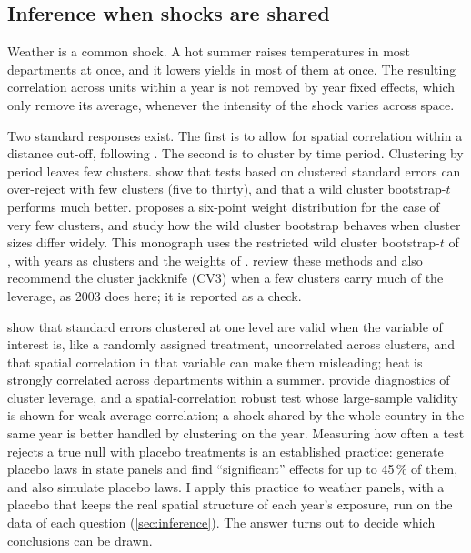 \subsection{Inference when shocks are shared}

Weather is a common shock. A hot summer raises temperatures in most departments at once, and it lowers yields in most of them at once. The resulting correlation across units within a year is not removed by year fixed effects, which only remove its average, whenever the intensity of the shock varies across space.

Two standard responses exist. The first is to allow for spatial correlation within a distance cut-off, following \textcite{conley1999}. The second is to cluster by time period. Clustering by period leaves few clusters. \textcite{cameron2008} show that tests based on clustered standard errors can over-reject with few clusters (five to thirty), and that a wild cluster bootstrap-$t$ performs much better. \textcite{webb2023} proposes a six-point weight distribution for the case of very few clusters, and \textcite{mackinnon2017} study how the wild cluster bootstrap behaves when cluster sizes differ widely. This monograph uses the restricted wild cluster bootstrap-$t$ of \textcite{cameron2008}, with years as clusters and the weights of \textcite{webb2023}. \textcite{mackinnon2023} review these methods and also recommend the cluster jackknife (CV3) when a few clusters carry much of the leverage, as 2003 does here; it is reported as a check.

\textcite{barrios2012} show that standard errors clustered at one level are valid when the variable of interest is, like a randomly assigned treatment, uncorrelated across clusters, and that spatial correlation in that variable can make them misleading; heat is strongly correlated across departments within a summer. \textcite{mackinnon2023summclust} provide diagnostics of cluster leverage, and \textcite{muller2022} a spatial-correlation robust test whose large-sample validity is shown for weak average correlation; a shock shared by the whole country in the same year is better handled by clustering on the year. Measuring how often a test rejects a true null with placebo treatments is an established practice: \textcite{bertrand2004} generate placebo laws in state panels and find ``significant'' effects for up to 45\,\% of them, and \textcite{mackinnon2017} also simulate placebo laws. I apply this practice to weather panels, with a placebo that keeps the real spatial structure of each year's exposure, run on the data of each question (\cref{sec:inference}). The answer turns out to decide which conclusions can be drawn.

